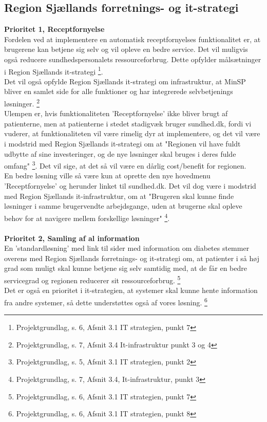 \subsection{Region Sjællands forretnings- og it-strategi}
\textbf{Prioritet 1, Receptfornyelse}\\
Fordelen ved at implementere en automatisk receptfornyelses funktionalitet er, at brugerene kan betjene sig selv og vil opleve en bedre service. Det vil muligvis også reducere sundhedspersonalets ressourceforbrug. Dette opfylder målsætninger i Region Sjællands it-strategi \footnote{Projektgrundlag, s. 6, Afsnit 3.1 IT strategien, punkt 7 }.\\
Det vil også opfylde Region Sjællands it-strategi om infrastruktur, at MinSP bliver en samlet side for alle funktioner og har integrerede selvbetjenings løsninger. \footnote{Projektgrundlag, s. 7, Afsnit 3.4 It-infrastruktur punkt 3 og 4}\\
Ulempen er, hvis funktionaliteten 'Receptfornyelse' ikke bliver brugt af patienterne, men at patienterne i stedet stadigvæk bruger sundhed.dk, fordi vi vuderer, at funktionaliteten vil være rimelig dyr at implementere, og det vil være i modstrid med Region Sjællands it-strategi om at "Regionen vil have fuldt udbytte af sine investeringer, og de nye løsninger skal bruges i deres fulde omfang" \footnote{Projektgrundlag, s. 5, Afsnit 3.1 IT strategien, punkt 2}. Det vil sige, at det så vil være en dårlig cost/benefit for regionen.\\ 
En bedre løsning ville så være kun at oprette den nye hovedmenu 'Receptfornyelse' og herunder linket til sundhed.dk. Det vil dog være i modstrid med Region Sjællands it-infrastruktur, om at "Brugeren skal kunne finde løsninger i samme brugervendte arbejdsgange, uden at brugerne skal opleve behov for at navigere mellem forskellige løsninger" \footnote{Projektgrundlag, s. 7, Afsnit 3.4, It-infrastruktur, punkt 3}. 
\\\\
\textbf{Prioritet 2, Samling af al information}\\
En 'standardløsning' med link til sider med information om diabetes stemmer overens med Region Sjællands forretnings- og it-strategi om, at patienter i så høj grad som muligt skal kunne betjene sig selv samtidig med, at de får en bedre servicegrad og regionen reducerer sit ressourceforbrug. \footnote{Projektgrundlag, s. 6, Afsnit 3.1 IT strategien, punkt 7} \\
Det er også en prioritet i it-strategien, at systemer skal kunne hente information fra andre systemer, så dette understøttes også af vores løsning. \footnote{Projektgrundlag, s. 6, Afsnit 3.1 IT strategien, punkt 8} \\

